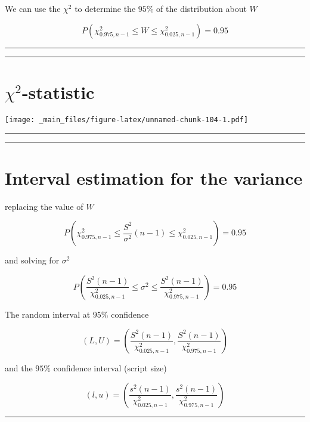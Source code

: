 \documentclass[
]{book}
\begin{document}
We can use the \(\chi^2\) to determine the \(95\%\) of the distribution about \(W\)

\[P(\chi^2_{0.975,n-1} \leq W \leq \chi^2_{0.025,n-1})=0.95\]

\begin{center}\rule{0.5\linewidth}{0.5pt}\end{center}

\begin{center}\rule{0.5\linewidth}{0.5pt}\end{center}

\hypertarget{chi2-statistic-2}{%
\section{\texorpdfstring{\(\chi^2\)-statistic}{\textbackslash chi\^{}2-statistic}}\label{chi2-statistic-2}}

\texttt{[image: \_main\_files/figure-latex/unnamed-chunk-104-1.pdf]}

\begin{center}\rule{0.5\linewidth}{0.5pt}\end{center}

\begin{center}\rule{0.5\linewidth}{0.5pt}\end{center}

\hypertarget{interval-estimation-for-the-variance-2}{%
\section{Interval estimation for the variance}\label{interval-estimation-for-the-variance-2}}

replacing the value of \(W\)

\[P(\chi^2_{0.975,n-1} \leq \frac{S^2}{\sigma^2}(n-1) \leq \chi^2_{0.025,n-1})=0.95\]

and solving for \(\sigma^2\)

\[P(\frac{S^2 (n-1)}{\chi^2_{0.025,n-1}}\leq \sigma^2 \leq \frac{S^2(n-1)}{\chi^2_{0.975,n-1}})=0.95\]

The random interval at \(95\%\) confidence

\[(L,U) = (\frac{S^2 (n-1)}{\chi^2_{0.025,n-1}},\frac{S^2(n-1)}{\chi^2_{0.975,n-1}})\]

and the \(95\%\) confidence interval (script size)

\[(l,u) = (\frac{s^2 (n-1)}{\chi^2_{0.025,n-1}},\frac{s^2(n-1)}{\chi^2_{0.975,n-1}})\]

\begin{center}\rule{0.5\linewidth}{0.5pt}\end{center}
\end{document}
